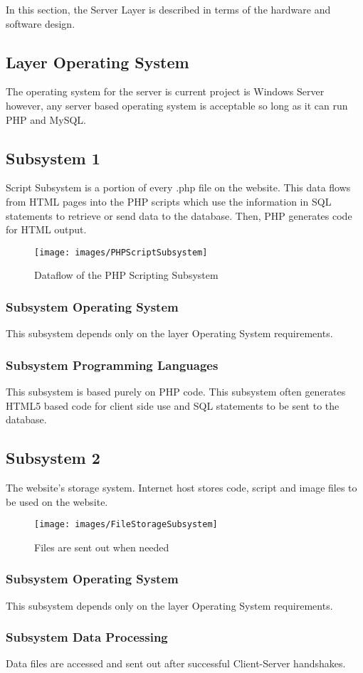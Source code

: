 In this section, the Server Layer is described in terms of the hardware and software design. 

\subsection{Layer Operating System}
The operating system for the server is current project is Windows Server however, any server based operating system is acceptable so long as it can run PHP and MySQL.

\subsection{Subsystem 1}
Script Subsystem is a portion of every .php file on the website. This data flows from HTML pages into the PHP scripts which use the information in SQL statements to retrieve or send data to the database. Then, PHP generates code for HTML output.

\begin{figure}[h!]
	\centering
 	\texttt{[image: images/PHPScriptSubsystem]}
 \caption{Dataflow of the PHP Scripting Subsystem}
\end{figure}

\subsubsection{Subsystem Operating System}
This subsystem depends only on the layer Operating System requirements.

\subsubsection{Subsystem Programming Languages}
This subsystem is based purely on PHP code. This subsystem often generates HTML5 based code for client side use and SQL statements to be sent to the database.

\subsection{Subsystem 2}
The website's storage system. Internet host stores code, script and image files to be used on the website. 

\begin{figure}[h!]
	\centering
 	\texttt{[image: images/FileStorageSubsystem]}
 \caption{Files are sent out when needed}
\end{figure}

\subsubsection{Subsystem Operating System}
This subsystem depends only on the layer Operating System requirements.

\subsubsection{Subsystem Data Processing}
Data files are accessed and sent out after successful Client-Server handshakes.